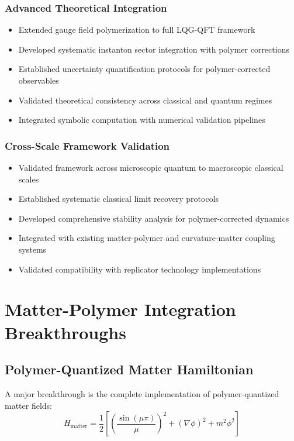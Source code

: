 \documentclass[11pt]{article}
\begin{document}
\subsubsection{Advanced Theoretical Integration}
\begin{itemize}
    \item Extended gauge field polymerization to full LQG-QFT framework
    \item Developed systematic instanton sector integration with polymer corrections
    \item Established uncertainty quantification protocols for polymer-corrected observables
    \item Validated theoretical consistency across classical and quantum regimes
    \item Integrated symbolic computation with numerical validation pipelines
\end{itemize}

\subsubsection{Cross-Scale Framework Validation}
\begin{itemize}
    \item Validated framework across microscopic quantum to macroscopic classical scales
    \item Established systematic classical limit recovery protocols
    \item Developed comprehensive stability analysis for polymer-corrected dynamics
    \item Integrated with existing matter-polymer and curvature-matter coupling systems
    \item Validated compatibility with replicator technology implementations
\end{itemize}

\section{Matter-Polymer Integration Breakthroughs}

\subsection{Polymer-Quantized Matter Hamiltonian}

A major breakthrough is the complete implementation of polymer-quantized matter fields:
\begin{equation}
H_{\text{matter}} = \frac{1}{2}\left[\left(\frac{\sin(\mu\pi)}{\mu}\right)^2 + (\nabla\phi)^2 + m^2\phi^2\right]
\end{equation}
\end{document}
